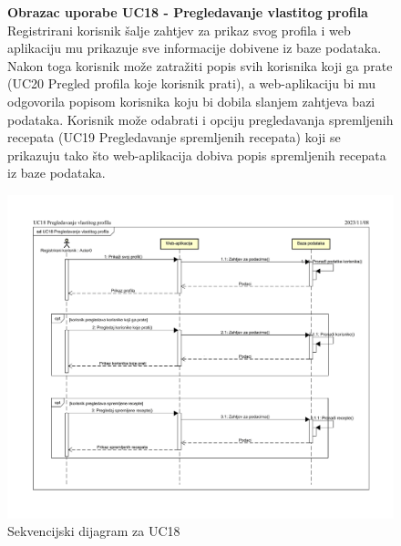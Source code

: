 			\begin{figure}[H]
				\textbf{Obrazac uporabe UC18 - Pregledavanje vlastitog profila}\\

				Registrirani korisnik šalje zahtjev za prikaz svog profila i web aplikaciju mu prikazuje sve informacije dobivene iz baze podataka. Nakon toga korisnik može zatražiti popis svih korisnika koji ga prate (UC20 Pregled profila koje korisnik prati), a web-aplikaciju bi mu odgovorila popisom korisnika koju bi dobila slanjem zahtjeva bazi podataka.
				Korisnik može odabrati i opciju pregledavanja spremljenih recepata (UC19 Pregledavanje spremljenih recepata) koji se prikazuju tako što web-aplikacija dobiva popis spremljenih recepata iz baze podataka.
				\begin{center}
					\includegraphics[scale = 0.8]{slike/SEK_UC18_Pregledavanje_vlastitog_profila.png}
					\caption{Sekvencijski dijagram za UC18}
					\label{fig:Sek_UC18}
				\end{center}
			\end{figure}

